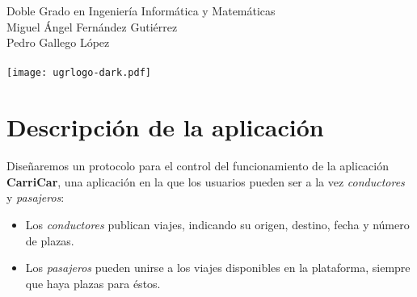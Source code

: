 \documentclass[10pt, a4paper]{article}
\theoremstyle{theorem-style}
\theoremstyle{theorem-style}
\theoremstyle{definition-style}
\theoremstyle{remark-style}
\theoremstyle{example-style}
\theoremstyle{definition-style}
\theoremstyle{remark-style}
\newcommand{\autor}{Miguel Ángel Fernández Gutiérrez\\Pedro Gallego López\\\hspace{1cm}}
\newcommand{\grado}{Doble Grado en Ingeniería Informática y Matemáticas}
\begin{document}
\begin{titlepage}

  \parbox[t]{\textwidth}{
  	\raggedright %
  	\fontsize{40pt}{40pt}\selectfont\sffamily{}
  }

	\vfill
	
	\parbox[t]{\textwidth}{
		\raggedright %
		\sffamily\large
		\grado\\
		{\Large \autor }\\[15pt]
		\texttt{[image: ugrlogo-dark.pdf]}
	}

\end{titlepage}


\thispagestyle{empty}
\tableofcontents
\newpage


\part{Descripción de la aplicación}

Diseñaremos un protocolo para el control del funcionamiento de la aplicación \textbf{CarriCar}, una aplicación en la que los usuarios pueden ser a la vez \emph{conductores} y \emph{pasajeros}:\vspace{-0.2cm}

\begin{itemize}
	\item Los \emph{conductores} publican viajes, indicando su origen, destino, fecha y número de plazas.\vspace{-0.2cm}
	\item Los \emph{pasajeros} pueden unirse a los viajes disponibles en la plataforma, siempre que haya plazas para éstos.\vspace{-0.2cm}
\end{itemize}
\end{document}
